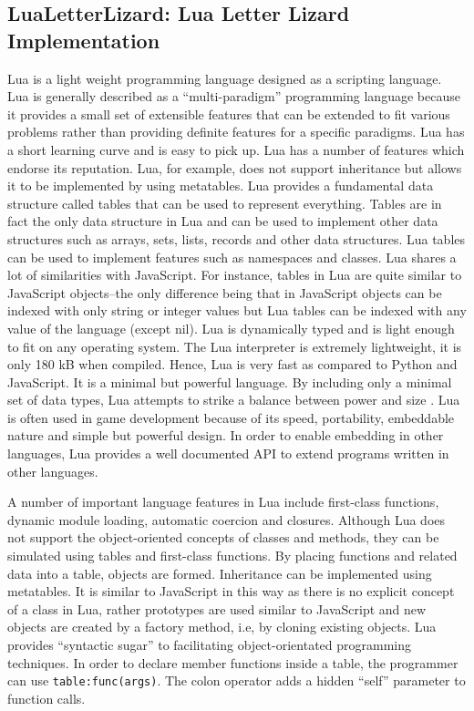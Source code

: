 \subsection{LuaLetterLizard: Lua Letter Lizard Implementation}
\label{luaimpl}

Lua is a light weight programming language designed as a scripting language. Lua is generally described as a ``multi-paradigm'' programming language because it provides a small set of extensible features that can be extended to fit various problems rather than providing definite features for a specific paradigms. Lua has a short learning curve and is easy to pick up. Lua has a number of features which endorse its reputation. Lua, for example, does not support inheritance but allows it to be implemented by using metatables.
Lua provides a fundamental data structure called tables that can be used to represent everything. Tables are in fact the only data structure in Lua and can be used to implement other data structures such as arrays, sets, lists, records and other data structures. Lua tables can be used to implement features such as namespaces and classes. Lua shares a lot of similarities with JavaScript. For instance, tables in Lua are quite similar to JavaScript objects--the only difference being that in JavaScript objects can be indexed with only string or integer values but Lua tables can be indexed with any value of the language (except nil). 
Lua is dynamically typed and is light enough to fit on any operating system. The Lua interpreter is extremely lightweight, it is only 180 kB when compiled. Hence, Lua is very fast as compared to Python and JavaScript. It is a minimal but powerful language. By including only a minimal set of data types, Lua attempts to strike a balance between power and size \cite{about_lua}.
Lua is often used in game development because of its speed, portability, embeddable nature and simple but powerful design. In order to enable embedding in other languages, Lua provides a well documented API to extend programs written in other languages. 

A number of important language features in Lua include first-class functions, dynamic module loading, automatic coercion and closures. Although Lua does not support the object-oriented concepts of classes and methods, they can be simulated using tables and first-class functions. By placing functions and related data into a table, objects are formed. Inheritance can be implemented using metatables. It is similar to JavaScript in this way as there is no explicit concept of a class in Lua, rather prototypes are used similar to JavaScript and new objects are created by a factory method, i.e, by cloning existing objects. Lua provides ``syntactic sugar'' to facilitating object-orientated programming techniques. In order to declare member functions inside a table, the programmer can use \texttt{table:func(args)}. The colon operator adds a hidden ``self'' parameter to function calls.

